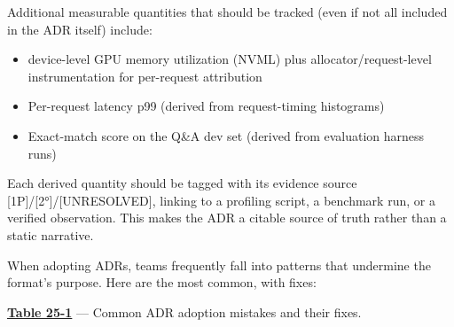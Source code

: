 Additional measurable quantities that should be tracked (even if not all
included in the ADR itself) include:

\begin{itemize}
\tightlist
\item
  device-level GPU memory utilization (NVML) plus
  allocator/request-level instrumentation for per-request attribution
\item
  Per-request latency p99 (derived from request-timing histograms)
\item
  Exact-match score on the Q\&A dev set (derived from evaluation harness
  runs)
\end{itemize}

Each derived quantity should be tagged with its evidence source
\mbox{{[}1P{]}}/\mbox{{[}2°{]}}/\mbox{{[}UNRESOLVED{]}}, linking to a profiling script, a
benchmark run, or a verified observation. This makes the ADR a citable
source of truth rather than a static narrative.

\label{common-mistakes}


When adopting ADRs, teams frequently fall into patterns that undermine
the format's purpose. Here are the most common, with fixes:

\textbf{\hyperref[tab:25.1]{Table 25-1}} --- Common ADR adoption mistakes and their fixes.

